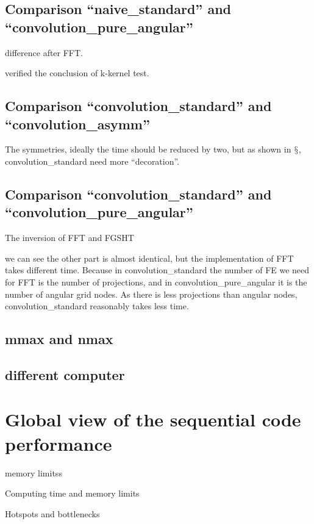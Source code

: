 \subsection{Comparison ``naive\_standard'' and ``convolution\_pure\_angular''}

\begin{figure}[h]
\caption{}
\end{figure}

difference after FFT.

verified the conclusion of k-kernel test.

\subsection{Comparison ``convolution\_standard'' and ``convolution\_asymm''}

\begin{figure}[h]
\caption{}
\end{figure}

The symmetries, ideally the time should be reduced by two, but as
shown in $\mathsection$, convolution\_standard need more ``decoration''.

\subsection{Comparison ``convolution\_standard'' and ``convolution\_pure\_angular''}

\begin{figure}[h]
\caption{}
\end{figure}

The inversion of FFT and FGSHT

we can see the other part is almost identical, but the implementation
of FFT takes different time. Because in convolution\_standard the
number of FE we need for FFT is the number of projections, and in
convolution\_pure\_angular it is the number of angular grid nodes.
As there is less projections than angular nodes, convolution\_standard
reasonably takes less time.

\subsection{mmax and nmax}

\subsection{different computer}

\section{Global view of the sequential code performance}

memory limitss

Computing time and memory limits

Hotspots and bottlenecks
